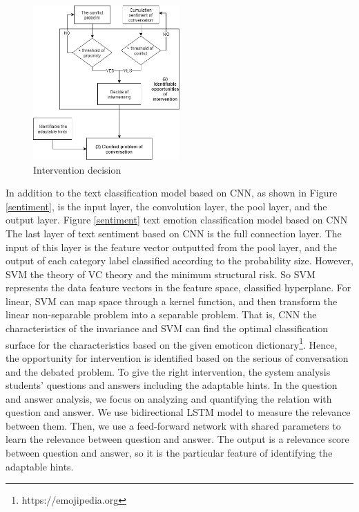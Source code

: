 \documentclass[letterpaper%
, twoside%
, 12pt%
,these%
, english%
,creativecommons,hyperref, withAlgo2e %
]{thETS}
\begin{document}
\begin{figure}
	\includegraphics[width=0.5\textwidth]{Figures/tsv.png}
	\caption{Intervention decision}
	\label{decide}
\end{figure}
In addition to the text classification model based on CNN, as shown in Figure \ref{sentiment}, is the input layer, the convolution layer, the pool layer, and the output layer. Figure \ref{sentiment} text emotion classification model based on CNN The last layer of text sentiment based on CNN is the full connection layer. The input of this layer is the feature vector outputted from the pool layer, and the output of each category label classified according to the probability size. However, SVM the theory of  VC theory and the minimum structural risk. So SVM represents the data feature vectors in the feature space, classified hyperplane.  For linear,  SVM can map space through a kernel function, and then transform the linear non-separable problem into a separable problem.  That is,  CNN the characteristics of the invariance and SVM can find the optimal classification surface for the characteristics based on the given emoticon dictionary\footnote{https://emojipedia.org}. Hence, the opportunity for intervention is identified based on the serious of conversation and the debated problem. To give the right intervention, the system analysis students' questions and answers including the adaptable hints. In the question and answer analysis, we focus on analyzing and quantifying the relation with question and answer. We use bidirectional LSTM model to measure the relevance between them. Then, we use a feed-forward network with shared parameters to learn the relevance between question and answer. The output is a relevance score between question and answer, so it is the particular feature of identifying the adaptable hints. 
\end{document}
